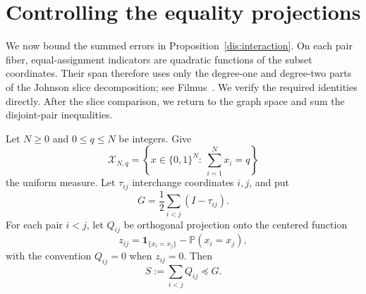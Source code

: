 \section{Controlling the equality projections}
\label{sl:section}

We now bound the summed errors in Proposition~\ref{dis:interaction}.
On each pair fiber, equal-assignment indicators are quadratic functions
of the subset coordinates. Their span therefore uses only the
degree-one and degree-two parts of the Johnson slice decomposition;
see Filmus~\cite[Lemmas~18 and~24]{Filmus16}. We verify the required
identities directly. After the slice comparison, we return to the graph
space and sum the disjoint-pair inequalities.

\begin{lemma}
\label{sl:comparison}
Let $N\ge0$ and $0\le q\le N$ be integers. Give
\[
 \mathcal X_{N,q}
 =\left\{x\in\{0,1\}^N:\ \sum_{i=1}^N x_i=q\right\}
\]
the uniform measure. Let $\tau_{ij}$ interchange coordinates $i,j$, and
put
\[
 G=\frac12\sum_{i<j}(I-\tau_{ij}).
\]
For each pair $i<j$, let $Q_{ij}$ be orthogonal projection onto the centered
function
\[
 z_{ij}=\mathbf 1_{\{x_i=x_j\}}
            -\mathbb P(x_i=x_j),
\]
with the convention $Q_{ij}=0$ when $z_{ij}=0$. Then
\begin{equation}
 S:=\sum_{i<j}Q_{ij}\preceq G.
 \label{sl:operator-comparison}
\end{equation}
\end{lemma}


